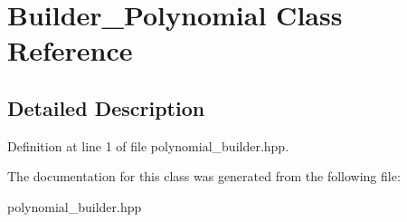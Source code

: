 \hypertarget{class_builder___polynomial}{}\section{Builder\+\_\+\+Polynomial Class Reference}
\label{class_builder___polynomial}


\subsection{Detailed Description}


Definition at line 1 of file polynomial\+\_\+builder.\+hpp.



The documentation for this class was generated from the following file\+:\begin{DoxyCompactItemize}
\item 
polynomial\+\_\+builder.\+hpp\end{DoxyCompactItemize}
